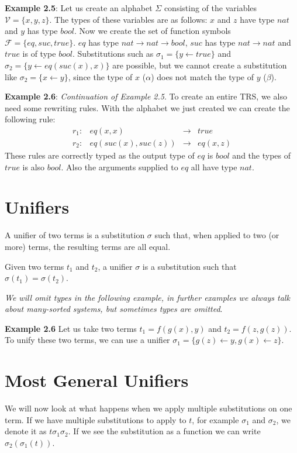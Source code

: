 \textbf{Example 2.5}: Let us create an alphabet $\Sigma$ consisting of the variables $\mathcal{V} = \{ x, y, z\}$. The types of these variables are as follows: $x$ and $z$ have type $nat$ and $y$ has type $bool$. Now we create the set of function symbols $\mathcal{F} = \{ eq, suc, true \}$. $eq$ has type $nat \rightarrow nat \rightarrow bool$, $suc$ has type $nat \rightarrow nat$ and $true$ is of type $bool$. Substitutions such as $\sigma_1 = \{ y \leftarrow true \}$ and $\sigma_2 = \{ y \leftarrow eq(suc(x), x) \}$ are possible, but we cannot create a substitution like $\sigma_2 = \{ x \leftarrow y \}$, since the type of $x$ ($\alpha$) does not match the type of $y$ ($\beta$).

\textbf{Example 2.6}: \textit{Continuation of Example 2.5}. To create an entire TRS, we also need some rewriting rules. With the alphabet we just created we can create the following rule: 
$$
\begin{array}{lrcl}
    r_1: & eq(x, x) & \rightarrow & true \\
    r_2: & eq(suc(x), suc(z)) & \rightarrow & eq(x, z)
\end{array}
$$
These rules are correctly typed as the output type of $eq$ is $bool$ and the types of $true$ is also $bool$. Also the arguments supplied to $eq$ all have type $nat$. 

\section{Unifiers}
A unifier of two terms is a substitution $\sigma$ such that, when applied to two (or more) terms, the resulting terms are all equal. 
\begin{definition}
Given two terms $t_1$ and $t_2$, a unifier $\sigma$ is a substitution such that $\sigma(t_1) = \sigma(t_2)$.
\end{definition}

\textit{We will omit types in the following example, in further examples we always talk about many-sorted systems, but sometimes types are omitted}.

\textbf{Example 2.6}  Let us take two terms $t_1 = f(g(x), y)$ and $t_2 = f(z, g(z))$. To unify these two terms, we can use a unifier $\sigma_1 = \{ g(z) \leftarrow y, g(x) \leftarrow z \}$.

\section{Most General Unifiers}
We will now look at what happens when we apply multiple substitutions on one term. If we have multiple substitutions to apply to $t$, for example $\sigma_1$ and $\sigma_2$, we denote it as $t\sigma_1\sigma_2$. If we see the substitution as a function we can write $\sigma_2\left( 
\sigma_1(t)\right)$.

